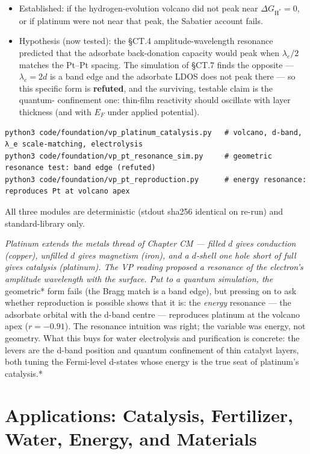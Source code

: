 \documentclass[
  10pt,
]{article}
\providecommand{\tightlist}{%
  \setlength{\itemsep}{0pt}\setlength{\parskip}{0pt}}
\begin{document}
\begin{itemize}
\tightlist
\item
  Established: if the hydrogen-evolution volcano did not peak near
  \(\Delta G_{\mathrm H^*} = 0\), or if platinum were not near that
  peak, the Sabatier account fails.
\item
  Hypothesis (now tested): the §CT.4 amplitude-wavelength resonance
  predicted that the adsorbate back-donation capacity would peak when
  \(\lambda_e/2\) matches the Pt--Pt spacing. The simulation of §CT.7
  finds the opposite --- \(\lambda_e = 2d\) is a band edge and the
  adsorbate LDOS does not peak there --- so this specific form is
  \textbf{refuted}, and the surviving, testable claim is the quantum-
  confinement one: thin-film reactivity should oscillate with layer
  thickness (and with \(E_F\) under applied potential).
\end{itemize}

\begin{verbatim}
python3 code/foundation/vp_platinum_catalysis.py   # volcano, d-band, λ_e scale-matching, electrolysis
python3 code/foundation/vp_pt_resonance_sim.py     # geometric resonance test: band edge (refuted)
python3 code/foundation/vp_pt_reproduction.py      # energy resonance: reproduces Pt at volcano apex
\end{verbatim}

All three modules are deterministic (stdout sha256 identical on re-run)
and standard-library only.

\emph{Platinum extends the metals thread of Chapter CM --- filled \(d\)
gives conduction (copper), unfilled \(d\) gives magnetism (iron), and a
\(d\)-shell one hole short of full gives catalysis (platinum). The VP
reading proposed a resonance of the electron's amplitude wavelength with
the surface. Put to a quantum simulation, the }geometric* form fails
(the Bragg match is a band edge), but pressing on to ask whether
reproduction is possible shows that it is: the \emph{energy} resonance
--- the adsorbate orbital with the d-band centre --- reproduces platinum
at the volcano apex (\(r=-0.91\)). The resonance intuition was right;
the variable was energy, not geometry. What this buys for water
electrolysis and purification is concrete: the levers are the d-band
position and quantum confinement of thin catalyst layers, both tuning
the Fermi-level d-states whose energy is the true seat of platinum's
catalysis.*

\hypertarget{applications-catalysis-fertilizer-water-energy-and-materials}{%
\section{Applications: Catalysis, Fertilizer, Water, Energy, and
Materials}\label{applications-catalysis-fertilizer-water-energy-and-materials}}
\end{document}
